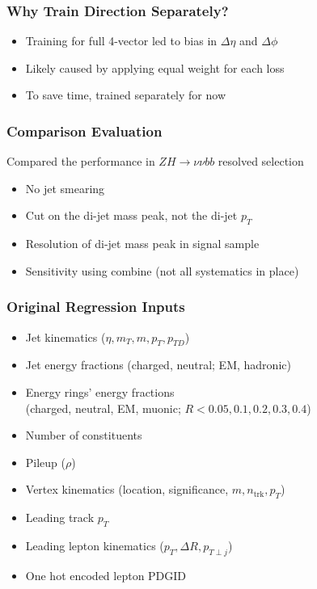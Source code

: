 \documentclass{beamer}
\begin{document}
\begin{frame}
  \frametitle{Why Train Direction Separately?}

  \begin{itemize}
  \item Training for full 4-vector led to bias in
    $\Delta \eta$ and $\Delta \phi$ 
  \item Likely caused by applying equal weight for each loss
  \item To save time, trained separately for now
  \end{itemize}


\end{frame}

\begin{frame}
  \frametitle{Comparison Evaluation}

  Compared the performance in $ZH \rightarrow \nu\nu bb$ resolved selection

  \begin{itemize}
  \item No jet smearing
  \item Cut on the di-jet mass peak, not the di-jet $p_T$
  \item Resolution of di-jet mass peak in signal sample
  \item Sensitivity using combine (not all systematics in place)
  \end{itemize}

\end{frame}

\begin{frame}
  \frametitle{Original Regression Inputs}

  \begin{itemize}
  \item Jet kinematics ($\eta, m_T, m, p_T, p_{TD}$)
  \item Jet energy fractions (charged, neutral; EM, hadronic)
  \item Energy rings' energy fractions \\
    (charged, neutral, EM, muonic; $R < 0.05, 0.1, 0.2, 0.3, 0.4$)
  \item Number of constituents
  \item Pileup ($\rho$)
  \item Vertex kinematics (location, significance, $m, n_\mathrm{trk}, p_T$)
  \item Leading track $p_T$
  \item Leading lepton kinematics ($p_T, \Delta R, p_{T\perp j}$)
  \item One hot encoded lepton PDGID
  \end{itemize}

\end{frame}
\end{document}

